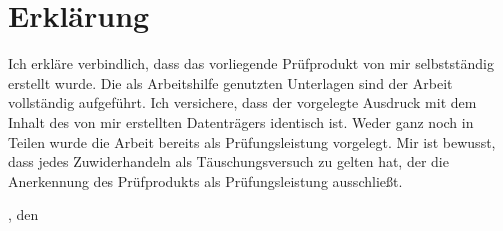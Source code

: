 \chapter{Erklärung}\label{ch:erklaerung}
Ich erkläre verbindlich, dass das vorliegende Prüfprodukt von mir selbstständig erstellt wurde.
Die als Arbeitshilfe genutzten Unterlagen sind der Arbeit vollständig aufgeführt.
Ich versichere, dass der vorgelegte Ausdruck mit dem Inhalt des von mir erstellten Datenträgers identisch ist.
Weder ganz noch in Teilen wurde die Arbeit bereits als Prüfungsleistung vorgelegt.
Mir ist bewusst, dass jedes Zuwiderhandeln als Täuschungsversuch zu gelten hat, der die Anerkennung des Prüfprodukts als Prüfungsleistung ausschließt.
\bigskip

\begingroup
\setlength{\parindent}{0pt} %

\locationDocument, den \dateDocument
\bigskip
\bigskip

\newlength{\widthbox}
\settowidth{\widthbox}{\locationDocument, den \dateDocument}

\makebox[\widthbox]{\hrulefill}\\
\authorDocument
\endgroup
